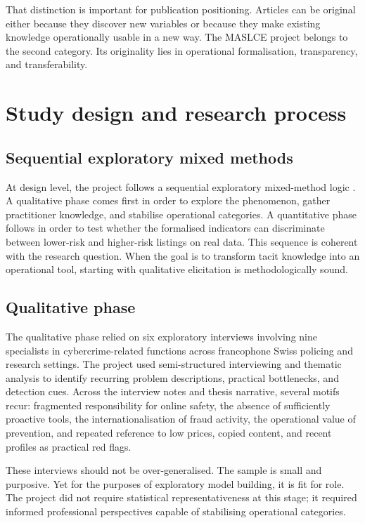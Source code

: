 \documentclass[11pt,a4paper]{article}
\begin{document}
That distinction is important for publication positioning. Articles can be original either because they discover new variables or because they make existing knowledge operationally usable in a new way. The MASLCE project belongs to the second category. Its originality lies in operational formalisation, transparency, and transferability.

\section{Study design and research process}
\subsection{Sequential exploratory mixed methods}
At design level, the project follows a sequential exploratory mixed-method logic \cite{fortin2022,thomas2006}. A qualitative phase comes first in order to explore the phenomenon, gather practitioner knowledge, and stabilise operational categories. A quantitative phase follows in order to test whether the formalised indicators can discriminate between lower-risk and higher-risk listings on real data. This sequence is coherent with the research question. When the goal is to transform tacit knowledge into an operational tool, starting with qualitative elicitation is methodologically sound.

\subsection{Qualitative phase}
The qualitative phase relied on six exploratory interviews involving nine specialists in cybercrime-related functions across francophone Swiss policing and research settings. The project used semi-structured interviewing and thematic analysis to identify recurring problem descriptions, practical bottlenecks, and detection cues. Across the interview notes and thesis narrative, several motifs recur: fragmented responsibility for online safety, the absence of sufficiently proactive tools, the internationalisation of fraud activity, the operational value of prevention, and repeated reference to low prices, copied content, and recent profiles as practical red flags.

These interviews should not be over-generalised. The sample is small and purposive. Yet for the purposes of exploratory model building, it is fit for role. The project did not require statistical representativeness at this stage; it required informed professional perspectives capable of stabilising operational categories.
\end{document}
